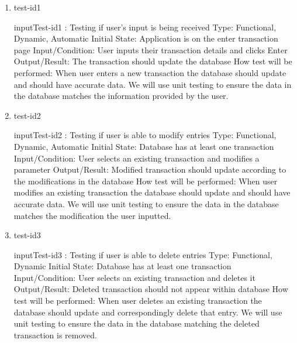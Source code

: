 \documentclass[12pt, titlepage]{article}
\begin{document}
\begin{enumerate}

\item{test-id1\\}

inputTest-id1 : Testing if user’s input is being received
\newline
Type: Functional, Dynamic, Automatic
\newline
Initial State: Application is on the enter transaction page
\newline
Input/Condition: User inputs their transaction details and clicks Enter
\newline
Output/Result: The transaction should update the database 
\newline
How test will be performed: When user enters a new transaction the database should update and should have accurate data. We will use unit testing to ensure the data in the database matches the information provided by the user.

					
\item{test-id2\\}

inputTest-id2 : Testing if user is able to modify entries
\newline
Type: Functional, Dynamic, Automatic
\newline
Initial State: Database has at least one transaction
\newline
Input/Condition: User selects an existing transaction and modifies a parameter
\newline
Output/Result: Modified transaction should update according to the modifications in the database
\newline
How test will be performed: When user modifies an existing transaction the database should update and should have accurate data. We will use unit testing to ensure the data in the database matches the modification the user inputted.

\item{test-id3\\}

inputTest-id3 : Testing if user is able to delete entries
\newline
Type: Functional, Dynamic
\newline
Initial State: Database has at least one transaction
\newline
Input/Condition: User selects an existing transaction and deletes it
\newline
Output/Result: Deleted transaction should not appear within database
\newline
How test will be performed: When user deletes an existing transaction the database should update and correspondingly delete that entry. We will use unit testing to ensure the data in the database matching the deleted transaction is removed.


\end{enumerate}
\end{document}
